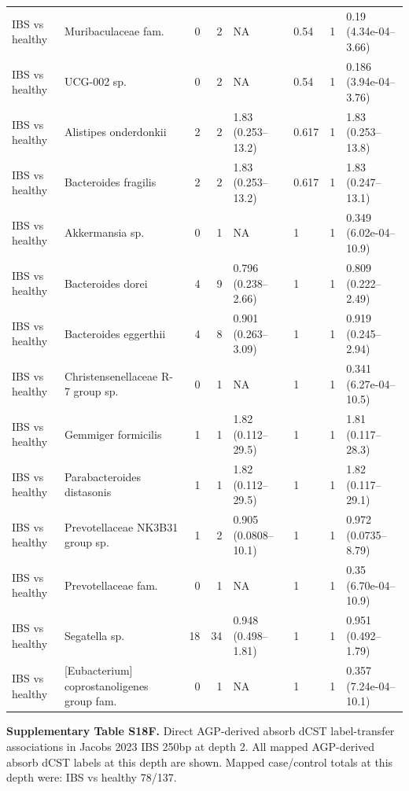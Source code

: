 \begin{longtable}{@{} p{} p{} r r p{} p{} p{} p{} @{}}
IBS vs healthy & Muribaculaceae fam. & 0 & 2 & NA & 0.54 & 1 & 0.19 (4.34e-04--3.66) \\
IBS vs healthy & UCG-002 sp. & 0 & 2 & NA & 0.54 & 1 & 0.186 (3.94e-04--3.76) \\
IBS vs healthy & Alistipes onderdonkii & 2 & 2 & 1.83 (0.253--13.2) & 0.617 & 1 & 1.83 (0.253--13.8) \\
IBS vs healthy & Bacteroides fragilis & 2 & 2 & 1.83 (0.253--13.2) & 0.617 & 1 & 1.83 (0.247--13.1) \\
IBS vs healthy & Akkermansia sp. & 0 & 1 & NA & 1 & 1 & 0.349 (6.02e-04--10.9) \\
IBS vs healthy & Bacteroides dorei & 4 & 9 & 0.796 (0.238--2.66) & 1 & 1 & 0.809 (0.222--2.49) \\
IBS vs healthy & Bacteroides eggerthii & 4 & 8 & 0.901 (0.263--3.09) & 1 & 1 & 0.919 (0.245--2.94) \\
IBS vs healthy & Christensenellaceae R-7 group sp. & 0 & 1 & NA & 1 & 1 & 0.341 (6.27e-04--10.5) \\
IBS vs healthy & Gemmiger formicilis & 1 & 1 & 1.82 (0.112--29.5) & 1 & 1 & 1.81 (0.117--28.3) \\
IBS vs healthy & Parabacteroides distasonis & 1 & 1 & 1.82 (0.112--29.5) & 1 & 1 & 1.82 (0.117--29.1) \\
IBS vs healthy & Prevotellaceae NK3B31 group sp. & 1 & 2 & 0.905 (0.0808--10.1) & 1 & 1 & 0.972 (0.0735--8.79) \\
IBS vs healthy & Prevotellaceae fam. & 0 & 1 & NA & 1 & 1 & 0.35 (6.70e-04--10.9) \\
IBS vs healthy & Segatella sp. & 18 & 34 & 0.948 (0.498--1.81) & 1 & 1 & 0.951 (0.492--1.79) \\
IBS vs healthy & [Eubacterium] coprostanoligenes group fam. & 0 & 1 & NA & 1 & 1 & 0.357 (7.24e-04--10.1) \\
\end{longtable}
\endgroup
\bigskip

\noindent\textbf{Supplementary Table S18F.} Direct AGP-derived absorb dCST label-transfer associations in Jacobs 2023 IBS 250bp at depth 2. All mapped AGP-derived absorb dCST labels at this depth are shown. Mapped case/control totals at this depth were: IBS vs healthy 78/137.

